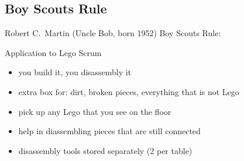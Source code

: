 \documentclass[
	aspectratio=169, %
	8pt, %
]{beamer}
\begin{document}
\subsection{Boy Scouts Rule}
\begin{frame}{\insertsubsection}
	\begin{fancycolumns}
		\vspace{-7mm}
		
		\begin{note}{{Robert C.\ Martin (Uncle Bob, born 1952)}}
			Boy Scouts Rule:  
		\end{note}
		\nextcolumn
		\begin{example}{Application to Lego Scrum}
			\begin{itemize}
				\item you build it, you disassembly it
				\item extra box for: dirt, broken pieces, everything that is not Lego
				\item pick up any Lego that you see on the floor
				\item help in diassembling pieces that are still connected
				\item disassembly tools stored separately (2 per table)
			\end{itemize}
		\end{example}
	\end{fancycolumns}
\end{frame}
\end{document}
